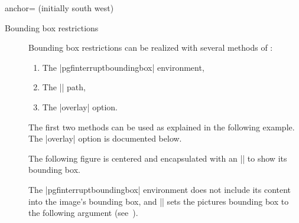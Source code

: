 \begin{pgfplotskey}{anchor= (initially south west)}
\begin{description}
\item[Bounding box restrictions] Bounding box restrictions can be realized with several methods of \PGF:
\begin{enumerate}
	\item The |pgfinterruptboundingbox| environment,
	\item The |\useasboundingbox| path,
	\item The |overlay| option.
\end{enumerate}
The first two methods can be used as explained in the following example. The |overlay| option is documented below.

\label{sec:bounding:box:example}%
{%
The following figure is centered and encapsulated with an |\fbox| to show its bounding box.
\begin{codeexample}[]
\setlength{\fboxsep}{0pt}%
%
\end{codeexample}%
}%
The |pgfinterruptboundingbox| environment does not include its content into the image's bounding box, and |\useasboundingbox| sets the pictures bounding box to the following argument (see~\cite{tikz}).

\end{description}
\end{pgfplotskey}


